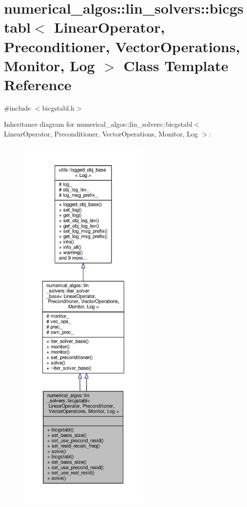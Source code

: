 \hypertarget{classnumerical__algos_1_1lin__solvers_1_1bicgstabl}{\section{numerical\-\_\-algos\-:\-:lin\-\_\-solvers\-:\-:bicgstabl$<$ Linear\-Operator, Preconditioner, Vector\-Operations, Monitor, Log $>$ Class Template Reference}
\label{classnumerical__algos_1_1lin__solvers_1_1bicgstabl}
}


{\ttfamily \#include $<$bicgstabl.\-h$>$}



Inheritance diagram for numerical\-\_\-algos\-:\-:lin\-\_\-solvers\-:\-:bicgstabl$<$ Linear\-Operator, Preconditioner, Vector\-Operations, Monitor, Log $>$\-:
\nopagebreak
\begin{figure}[H]
\begin{center}
\leavevmode
\includegraphics[height=550pt]{classnumerical__algos_1_1lin__solvers_1_1bicgstabl__inherit__graph}
\end{center}
\end{figure}



